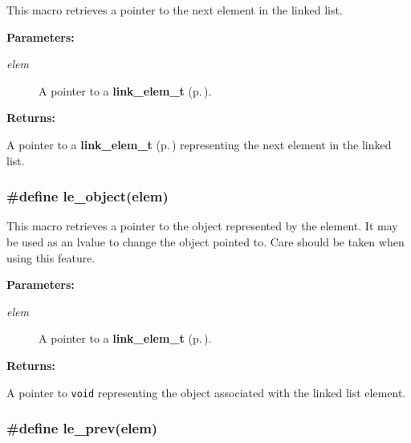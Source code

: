  This macro retrieves a pointer to the next element in the linked list.\begin{Desc}
\item[{\bf Parameters: }]\par
\begin{description}
\item[
{\em elem}]A pointer to a {\bf link\_\-elem\_\-t} {\rm (p.\,\pageref{group__dbprim__link_a1})}.

\end{description}
\end{Desc}
\begin{Desc}
\item[{\bf Returns: }]\par
A pointer to a {\bf link\_\-elem\_\-t} {\rm (p.\,\pageref{group__dbprim__link_a1})} representing the next element in the linked list. \end{Desc}
\subsubsection{\setlength{\rightskip}{0pt plus 5cm}\#define le\_\-object(elem)}\label{group__dbprim__link_a23}




 This macro retrieves a pointer to the object represented by the element. It may be used as an lvalue to change the object pointed to. Care should be taken when using this feature.\begin{Desc}
\item[{\bf Parameters: }]\par
\begin{description}
\item[
{\em elem}]A pointer to a {\bf link\_\-elem\_\-t} {\rm (p.\,\pageref{group__dbprim__link_a1})}.

\end{description}
\end{Desc}
\begin{Desc}
\item[{\bf Returns: }]\par
A pointer to {\tt void} representing the object associated with the linked list element. \end{Desc}
\subsubsection{\setlength{\rightskip}{0pt plus 5cm}\#define le\_\-prev(elem)}\label{group__dbprim__link_a22}




